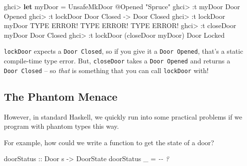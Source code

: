 \documentclass[]{article}
\newenvironment{Shaded}{}{}
\newcommand{\CommentTok}[1]{\textcolor[rgb]{0.38,0.63,0.69}{\textit{#1}}}
\newcommand{\DataTypeTok}[1]{\textcolor[rgb]{0.56,0.13,0.00}{#1}}
\newcommand{\KeywordTok}[1]{\textcolor[rgb]{0.00,0.44,0.13}{\textbf{#1}}}
\newcommand{\NormalTok}[1]{#1}
\newcommand{\OperatorTok}[1]{\textcolor[rgb]{0.40,0.40,0.40}{#1}}
\newcommand{\OtherTok}[1]{\textcolor[rgb]{0.00,0.44,0.13}{#1}}
\newcommand{\StringTok}[1]{\textcolor[rgb]{0.25,0.44,0.63}{#1}}
\begin{document}
\begin{Shaded}
\begin{Highlighting}[]
\NormalTok{ghci}\OperatorTok{>} \KeywordTok{let}\NormalTok{ myDoor }\OtherTok{=} \DataTypeTok{UnsafeMkDoor} \OperatorTok{@}\DataTypeTok{\textquotesingle{}Opened} \StringTok{"Spruce"}
\NormalTok{ghci}\OperatorTok{>} \OperatorTok{:}\NormalTok{t myDoor}
\DataTypeTok{Door} \DataTypeTok{\textquotesingle{}Opened}
\NormalTok{ghci}\OperatorTok{>} \OperatorTok{:}\NormalTok{t lockDoor}
\DataTypeTok{Door} \DataTypeTok{\textquotesingle{}Closed} \OtherTok{{-}>} \DataTypeTok{Door} \DataTypeTok{\textquotesingle{}Closed}
\NormalTok{ghci}\OperatorTok{>} \OperatorTok{:}\NormalTok{t lockDoor myDoor}
\DataTypeTok{TYPE} \DataTypeTok{ERROR}\OperatorTok{!}  \DataTypeTok{TYPE} \DataTypeTok{ERROR}\OperatorTok{!}  \DataTypeTok{TYPE} \DataTypeTok{ERROR}\OperatorTok{!}
\NormalTok{ghci}\OperatorTok{>} \OperatorTok{:}\NormalTok{t closeDoor myDoor}
\DataTypeTok{Door} \DataTypeTok{\textquotesingle{}Closed}
\NormalTok{ghci}\OperatorTok{>} \OperatorTok{:}\NormalTok{t lockDoor (closeDoor myDoor)}
\DataTypeTok{Door} \DataTypeTok{\textquotesingle{}Locked}
\end{Highlighting}
\end{Shaded}

\texttt{lockDoor} expects a \texttt{Door\ \textquotesingle{}Closed}, so if you
give it a \texttt{Door\ \textquotesingle{}Opened}, that's a static compile-time
type error. But, \texttt{closeDoor} takes a
\texttt{Door\ \textquotesingle{}Opened} and returns a
\texttt{Door\ \textquotesingle{}Closed} -- so \emph{that} is something that you
can call \texttt{lockDoor} with!

\hypertarget{the-phantom-menace}{%
\subsection{The Phantom Menace}\label{the-phantom-menace}}

However, in standard Haskell, we quickly run into some practical problems if we
program with phantom types this way.

For example, how could we write a function to get the state of a door?

\begin{Shaded}
\begin{Highlighting}[]
\OtherTok{doorStatus ::} \DataTypeTok{Door}\NormalTok{ s }\OtherTok{{-}>} \DataTypeTok{DoorState}
\NormalTok{doorStatus \_ }\OtherTok{=} \CommentTok{{-}{-} ?}
\end{Highlighting}
\end{Shaded}
\end{document}
